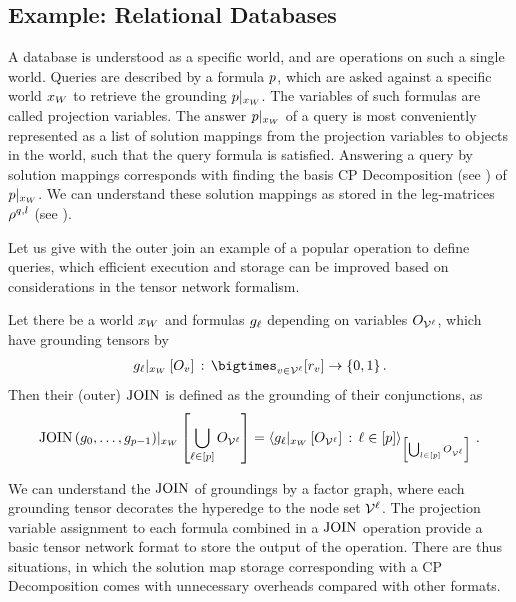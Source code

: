 \subsection{Example: Relational Databases}

A database is understood as a specific \firstOrderLogic{} world, and are operations on such a single world.
Queries are described by a formula $p$, which are asked against a specific world $x_{W}$ to retrieve the grounding ${p}|_{x_{W}}$.
The variables of such formulas are called projection variables.
The answer ${p}|_{x_{W}}$ of a query is most conveniently represented as a list of solution mappings from the projection variables to objects in the world, such that the query formula is satisfied.
Answering a query by solution mappings corresponds with finding the basis CP Decomposition (see ) of ${p}|_{x_{W}}$.
We can understand these solution mappings as stored in the leg-matrices $\rho^{q,l}$ (see ).

Let us give with the outer join an example of a popular operation to define queries, which efficient execution and storage can be improved based on considerations in the tensor network formalism.

\begin{definition}
    Let there be a world $x_{W}$ and formulas $g_{\ell}$ depending on variables $O_{\mathcal{V}^{\ell}}$, which have grounding tensors by
    \begin{align*}
        \groundingofat{\extformulaof{\selindex}}{\indvariableof{\node}} \wcols  \bigtimes_{\node\in\nodesof{\selindex}}[\inddimof{\node}] \rightarrow \ozset \, .
    \end{align*}
    Then their (outer) $\mathrm{JOIN}$ is defined as the grounding of their conjunctions, as
    \begin{align*}
        {\mathrm{JOIN}\left(g_{0},\ldots,g_{p-1}\right)}|_{x_{W}} \left[\bigcup_{\ell\in[p]}O_{\mathcal{V}^{\ell}}\right]
        = \left\langle {g_{\ell}}|_{x_{W}} \left[O_{\mathcal{V}^{\ell}}\right]\,:\,\ell\in[p]\right\rangle_{\left[ \bigcup_{l\in[p]}O_{\mathcal{V}^{\ell}} \right]} \, .
    \end{align*}
\end{definition}

We can understand the $\mathrm{JOIN}$ of groundings by a factor graph, where each grounding tensor decorates the hyperedge to the node set $\mathcal{V}^{\ell}$.
The projection variable assignment to each formula combined in a $\mathrm{JOIN}$ operation provide a basic tensor network format to store the output of the operation.
There are thus situations, in which the solution map storage corresponding with a CP Decomposition comes with unnecessary overheads compared with other formats.

